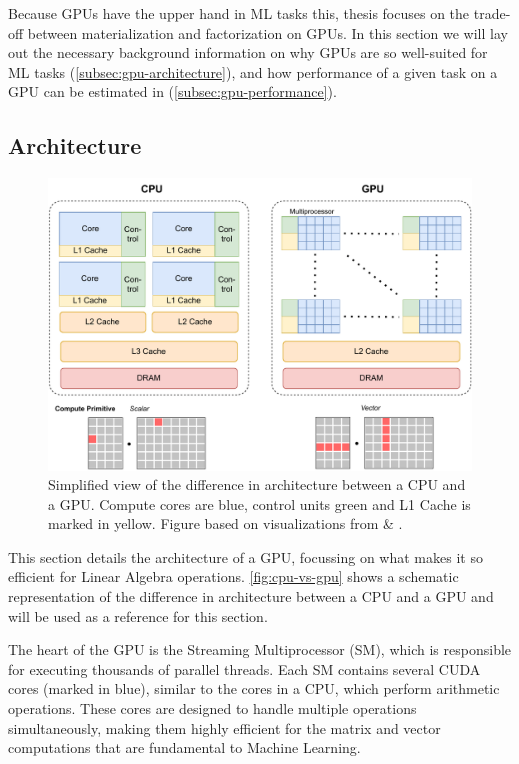 Because GPUs have the upper hand in ML tasks this, thesis focuses on the trade-off between materialization and factorization on GPUs. In this section we will lay out the necessary background information on why GPUs are so well-suited for ML tasks (\autoref{subsec:gpu-architecture}), and how performance of a given task on a GPU can be estimated in (\autoref{subsec:gpu-performance}).

\subsection{Architecture}
\label{subsec:gpu-architecture}

\begin{figure}[ht]
    \includegraphics[width=.95\linewidth]{chapters/02_preliminaries/figures/CPU-vs-GPU.pdf}
    \caption[Simplified view of the difference in architecture between a CPU and a GPU.]{ Simplified view of the difference in architecture between a CPU and a GPU. Compute cores are blue, control units green and L1 Cache is marked in yellow. Figure based on visualizations from \cite{gpu-in-ml-survey} \& \cite{cuda-programming-guide}.}
    \label{fig:cpu-vs-gpu}
\end{figure}
This section details the architecture of a GPU, focussing on what makes it so efficient for Linear Algebra operations. \autoref{fig:cpu-vs-gpu} shows a schematic representation of the difference in architecture between a CPU and a GPU and will be used as a reference for this section.

The heart of the GPU is the Streaming Multiprocessor (SM), which is responsible for executing thousands of parallel threads. Each SM contains several CUDA cores (marked in blue), similar to the cores in a CPU, which perform arithmetic operations. These cores are designed to handle multiple operations simultaneously, making them highly efficient for the matrix and vector computations that are fundamental to Machine Learning.

